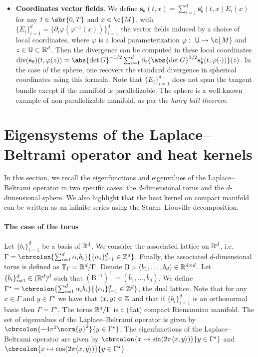 \begin{itemize}[wide]
	\item \textbf{Coordinates vector fields}.
	      We define $\mathbf{s}_\theta(t, x) = \sum_{i=1}^d \mathbf{s}^i_\theta(t,x) E_i(x)$ for any $t \in \sbr{0,T}$ and $x \in \c{M}$, with $\{E_i\}_{i=1}^d = \{\partial_i \varphi(\varphi^{-1}(x))\}_{i=1}^d$ the vector fields induced by a choice of local coordinates, where $\varphi$ is a local parameterization $\varphi: \ \mathsf{U} \to \c{M}$ and $z \in \mathsf{U} \subset \mathbb{R}^d$.
	      Then the divergence can be computed in these local coordinates $\mathrm{div}(\mathbf{s}_\theta)(t, \varphi(z)) =\abs{\det G}^{-1/2} \sum_{i=1}^d \partial_i \{ \abs{\det G}^{1/2} \mathbf{s}^i_\theta(t, \varphi(\cdot))\}(z)$.
	      In the case of the sphere, one recovers the standard divergence in spherical coordinates using this formula.
	      Note that $\{E_i\}_{i=1}^d$ does not span the tangent bundle except if the manifold is parallelizable.
	      The sphere is a well-known example of non-parallelizable manifold, as per the \emph{hairy ball theorem}.
\end{itemize}

\section{Eigensystems of the Laplace--Beltrami operator and heat kernels}
\label{sec:eigenf-eigenv-lapl}

In this section, we recall the eigenfunctions and eigenvalues of the Laplace--Beltrami operator in two specific cases: the $d$-dimensional torus and the $d$-dimensional sphere.
We also highlight that the heat kernel on compact manifold can be written as an infinite series using the Sturm--Liouville decomposition.

\paragraph{The case of the torus}
Let $\{b_i\}_{i=1}^d$ be a basis of $\mathbb{R}^d$.
We consider the associated lattice on $\mathbb{R}^d$, i.e. $\Gamma = \cbrcolon{\sum_{i=1}^d \alpha_i b_i}{\{\alpha_i\}_{i=1}^d \in \Z^d}$.
Finally, the associated $d$-dimensional torus is defined as $\mathbb{T}_\Gamma = \mathbb{R}^d / \Gamma$.
Denote $\mathrm{B} = (b_1, \dots, b_d) \in \mathbb{R}^{d \times d}$.
Let $\{\bar{b}_i\}_{i=1}^d \in (\mathbb{R}^d)^d$ such that $(\mathrm{B}^{-1})^\top = (\bar{b}_1, \dots, \bar{b}_d)$.
We define $\Gamma^\star = \cbrcolon{\sum_{i=1}^d \alpha_i \bar{b}_i}{\{\alpha_i\}_{i=1}^d \in \Z^d}$, the dual lattice.
Note that for any $x \in \Gamma$ and $y \in \Gamma^\star$ we have that $\langle x, y \rangle \in \mathbb{Z}$ and that if $\{b_i\}_{i=1}^d$ is an orthonormal basis then $\Gamma = \Gamma^\star$.
The torus $\mathbb{R}^d/\Gamma$ is a (flat) compact Riemannian manifold.
The set of eigenvalues of the Laplace--Beltrami operator is given by $\cbrcolon{-4 \pi^2 \norm{y}^2}{y \in \Gamma^\star}$.
The eigenfunctions of the Laplace--Beltrami operator are given by $\cbrcolon{x \mapsto \sin(2 \pi \langle x, y \rangle)}{y \in \Gamma^\star}$ and $\cbrcolon{x \mapsto \cos(2 \pi \langle x, y \rangle)}{y \in \Gamma^\star}$.

